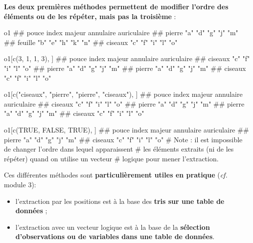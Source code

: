 \documentclass[12pt,twosided, notitlepage]{book}
\newenvironment{Shaded}{}{}
\newcommand{\KeywordTok}[1]{\textcolor[rgb]{0.00,0.00,1.00}{{#1}}}
\newcommand{\DecValTok}[1]{{#1}}
\newcommand{\StringTok}[1]{\textcolor[rgb]{0.00,0.50,0.50}{{#1}}}
\newcommand{\CommentTok}[1]{\textcolor[rgb]{0.00,0.50,0.00}{{#1}}}
\newcommand{\OtherTok}[1]{\textcolor[rgb]{1.00,0.25,0.00}{{#1}}}
\newcommand{\NormalTok}[1]{{#1}}
\providecommand{\tightlist}{%
  \setlength{\itemsep}{0pt}\setlength{\parskip}{0pt}}
\renewenvironment{Shaded}{\begin{snugshade}}{\end{snugshade}}
\begin{document}
\textbf{Les deux premières méthodes permettent de modifier l'ordre des
éléments ou de les répéter, mais pas la troisième} :

\begin{Shaded}
\begin{Highlighting}[]
\NormalTok{o1}
  \NormalTok{##         pouce index majeur annulaire auriculaire}
  \NormalTok{## pierre  "a"   "d"   "g"    "j"       "m"        }
  \NormalTok{## feuille "b"   "e"   "h"    "k"       "n"        }
  \NormalTok{## ciseaux "c"   "f"   "i"    "l"       "o"}

\NormalTok{o1[}\KeywordTok{c}\NormalTok{(}\DecValTok{3}\NormalTok{, }\DecValTok{1}\NormalTok{, }\DecValTok{1}\NormalTok{, }\DecValTok{3}\NormalTok{), ]}
  \NormalTok{##         pouce index majeur annulaire auriculaire}
  \NormalTok{## ciseaux "c"   "f"   "i"    "l"       "o"        }
  \NormalTok{## pierre  "a"   "d"   "g"    "j"       "m"        }
  \NormalTok{## pierre  "a"   "d"   "g"    "j"       "m"        }
  \NormalTok{## ciseaux "c"   "f"   "i"    "l"       "o"}


\NormalTok{o1[}\KeywordTok{c}\NormalTok{(}\StringTok{"ciseaux"}\NormalTok{, }\StringTok{"pierre"}\NormalTok{, }\StringTok{"pierre"}\NormalTok{, }\StringTok{"ciseaux"}\NormalTok{), ]}
  \NormalTok{##         pouce index majeur annulaire auriculaire}
  \NormalTok{## ciseaux "c"   "f"   "i"    "l"       "o"        }
  \NormalTok{## pierre  "a"   "d"   "g"    "j"       "m"        }
  \NormalTok{## pierre  "a"   "d"   "g"    "j"       "m"        }
  \NormalTok{## ciseaux "c"   "f"   "i"    "l"       "o"}

\NormalTok{o1[}\KeywordTok{c}\NormalTok{(}\OtherTok{TRUE}\NormalTok{, }\OtherTok{FALSE}\NormalTok{, }\OtherTok{TRUE}\NormalTok{), ]}
  \NormalTok{##         pouce index majeur annulaire auriculaire}
  \NormalTok{## pierre  "a"   "d"   "g"    "j"       "m"        }
  \NormalTok{## ciseaux "c"   "f"   "i"    "l"       "o"}
\CommentTok{# Note : il est impossible de changer l'ordre dans lequel apparaissent}
\CommentTok{# les éléments extraits (ni de les répéter) quand on utilise un vecteur}
\CommentTok{# logique pour mener l'extraction.}
\end{Highlighting}
\end{Shaded}

Ces différentes méthodes sont \textbf{particulièrement utiles en
pratique} (\emph{cf.} module 3):

\begin{itemize}
\tightlist
\item
  l'extraction par les positions est à la base des \textbf{tris sur une
  table de données} ;
\item
  l'extraction avec un vecteur logique est à la base de la
  \textbf{sélection d'observations ou de variables dans une table de
  données}.
\end{itemize}
\end{document}
